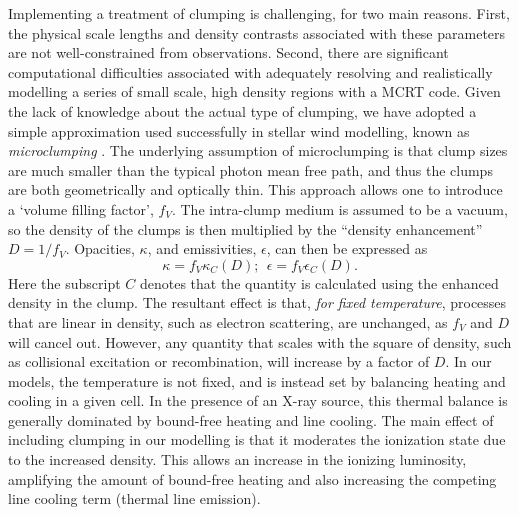 \documentclass[useAMS,usenatbib]{mn2e_x}
\begin{document}
Implementing a treatment of clumping is challenging, for
two main reasons. First, the physical scale lengths and density contrasts 
associated with these parameters are not well-constrained from observations.  
Second, there are significant computational difficulties associated with adequately
resolving and realistically modelling a series of small scale, high density
regions with a MCRT code. 
Given the lack of knowledge about the actual type of clumping, we have adopted
a simple approximation
used successfully in stellar wind modelling, known as 
{\em microclumping} \citep[e.g.][]{hamann1998,hilliermiller1999,hamann2008}. 
The underlying assumption of microclumping is that clump sizes are much smaller than the 
typical photon mean free path, and thus the clumps are 
both geometrically and optically thin. This approach 
allows one to introduce a `volume filling factor', $f_V$. 
The intra-clump medium is assumed to be a vacuum, so the 
density of the clumps is then multiplied by the ``density enhancement'' 
$D=1/f_V$. Opacities, $\kappa$, and emissivities, $\epsilon$, 
can then be expressed as 
\begin{equation}
\kappa = f_V \kappa_C(D);~~\epsilon = f_V \epsilon_C(D).
\end{equation}
Here the subscript $C$ denotes that the quantity is calculated using the 
enhanced density in the clump. The resultant effect is that, {\em for fixed temperature},
 processes that are linear in density, such as electron scattering, are unchanged, 
as $f_V$ and $D$ will cancel out. However, any quantity that scales with the square of density, 
such as collisional excitation or recombination, will increase by a factor of $D$.
In our models, the temperature is not fixed, and is instead set by balancing heating and 
cooling in a given cell. In the presence of an X-ray source, this thermal balance is 
generally dominated by bound-free heating and line cooling. The main effect of including 
clumping in our modelling is that it moderates the ionization state due to the increased 
density. This allows an increase in the ionizing luminosity, amplifying the amount of
bound-free heating and also increasing the competing line cooling term
(thermal line emission).
\end{document}
